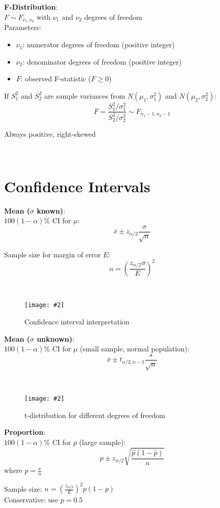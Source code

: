 \documentclass{article}
\def\imagewidth{0.9}
\newenvironment{cheatformula}[1][Title]{
    \begin{minipage}{\linewidth}
    \textbf{#1}:\\
}{
    \end{minipage}\\[2ex]
}
\newcommand{\cheatimage}[4][\imagewidth]{
    \begin{figure}[H]
        \centering
        \texttt{[image: \#2]}
        \caption{#3}
        \label{#4}
    \end{figure}
}
\begin{document}
\begin{multicols*}{2}
\begin{cheatformula}[F-Distribution]
    $F \sim F_{\nu_1, \nu_2}$ with $\nu_1$ and $\nu_2$ degrees of freedom\\
    Parameters:
    \begin{itemize}
        \item $\nu_1$: numerator degrees of freedom (positive integer)
        \item $\nu_2$: denominator degrees of freedom (positive integer)
        \item $F$: observed F-statistic ($F \geq 0$)
    \end{itemize}
    
    If $S_1^2$ and $S_2^2$ are sample variances from $N(\mu_1, \sigma_1^2)$ and $N(\mu_2, \sigma_2^2)$:
    $$F = \frac{S_1^2/\sigma_1^2}{S_2^2/\sigma_2^2} \sim F_{n_1-1, n_2-1}$$
    
    Always positive, right-skewed
\end{cheatformula}

\section{Confidence Intervals}

\begin{cheatformula}[Mean ($\sigma$ known)]
    $100(1-\alpha)\%$ CI for $\mu$:
    $$\overline{x} \pm z_{\alpha/2} \frac{\sigma}{\sqrt{n}}$$
    
    Sample size for margin of error $E$:
    $$n = \left(\frac{z_{\alpha/2}\sigma}{E}\right)^2$$
\end{cheatformula}

\cheatimage[1.0]{confidence_interval.png}{Confidence interval interpretation}{fig:confidence-interval}

\begin{cheatformula}[Mean ($\sigma$ unknown)]
    $100(1-\alpha)\%$ CI for $\mu$ (small sample, normal population):
    $$\overline{x} \pm t_{\alpha/2,n-1} \frac{s}{\sqrt{n}}$$
\end{cheatformula}

\cheatimage[1.0]{t-for-different-v.png}{t-distribution for different degrees of freedom}{fig:t-for-different-v}

\begin{cheatformula}[Proportion]
    $100(1-\alpha)\%$ CI for $p$ (large sample):
    $$\hat{p} \pm z_{\alpha/2}\sqrt{\frac{\hat{p}(1-\hat{p})}{n}}$$
    where $\hat{p} = \frac{x}{n}$
    
    Sample size: $n = \left(\frac{z_{\alpha/2}}{E}\right)^2 p(1-p)$\\
    Conservative: use $p = 0.5$
\end{cheatformula}


\end{multicols*}
\end{document}
